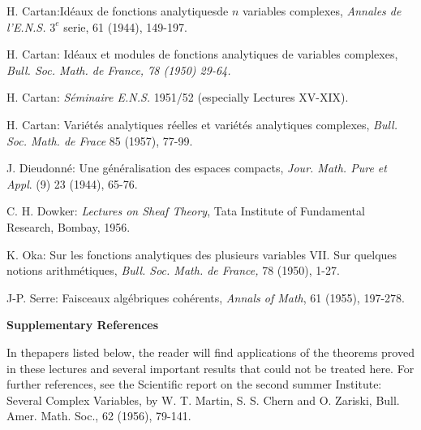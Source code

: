\begin{thebibliography}{99}
 H. Cartan:\pageoriginale Id\'eaux de fonctions
  analytiquesde $n$ variables complexes, \textit{Annales de
    l'E.N.S.} $3^e$ serie, 61 (1944), 149-197. 

 H. Cartan: Id\'eaux et modules de fonctions analytiques
  de variables complexes, \textit{Bull. Soc. Math. de France, 78
    (1950) 29-64.}

 H. Cartan: \textit{S\'eminaire E.N.S.} 1951/52
  (especially Lectures XV-XIX). 

 H. Cartan: Vari\'et\'es analytiques r\'eelles et
  vari\'et\'es analytiques complexes, \textit{Bull. Soc. Math. de
    Frace} 85 (1957), 77-99.

 J. Dieudonn\'e: Une g\'en\'eralisation des espaces
  compacts, \textit{Jour. Math. Pure et Appl}. (9) 23 (1944), 65-76.

 C. H. Dowker: \textit{Lectures on Sheaf Theory}, Tata
  Institute of Fundamental Research, Bombay, 1956.

 K. Oka: Sur les fonctions analytiques des plusieurs
  variables VII. Sur quelques notions arithm\'etiques,
  \textit{Bull. Soc. Math. de France,} 78 (1950), 1-27.

 J-P. Serre: Faisceaux alg\'ebriques coh\'erents,
  \textit{Annals of Math}, 61 (1955), 197-278.

\end{thebibliography}


\begin{center}
\textbf{Supplementary References}
\end{center}

In the\pageoriginale papers listed below, the reader will find
applications of the theorems proved in these lectures and several
important results that could not be treated here. For further
references, see the Scientific report on the second summer Institute:
Several Complex Variables, by W. T. Martin, S. S. Chern and
O. Zariski, Bull. Amer. Math. Soc., 62 (1956), 79-141.


